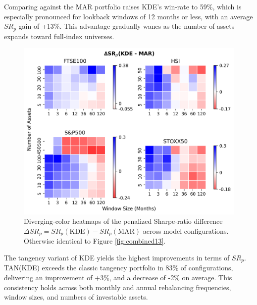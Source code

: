 Comparing against the MAR portfolio raises KDE's win-rate to 59\%, which is especially pronounced for lookback windows of 12 months or less, with an average $SR_{p}$ gain of +13\%. This advantage gradually wanes as the number of assets expands toward full-index universes.

\begin{figure}[H]
  \begin{center}
  \begin{minipage}{1\textwidth}
    \centering
    \includegraphics[width=\textwidth]{images/40_15.png}
  \end{minipage}
  \caption[Heatmap 2]{Diverging-color heatmaps of the penalized Sharpe-ratio difference $\Delta SR_p = SR_p(\mathrm{KDE}) - SR_p(\mathrm{MAR})$ across model configurations. Otherwise identical to Figure \ref{fig:combined13}.}
  \label{fig:combined14}
  \end{center}
  \end{figure}

The tangency variant of KDE yields the highest improvements in terms of $SR_{p}$. TAN(KDE) exceeds the classic tangency portfolio in 83\% of configurations, delivering an improvement of +3\%, and a decrease of -2\% on average. This consistency holds across both monthly and annual rebalancing frequencies, window sizes, and numbers of investable assets.

